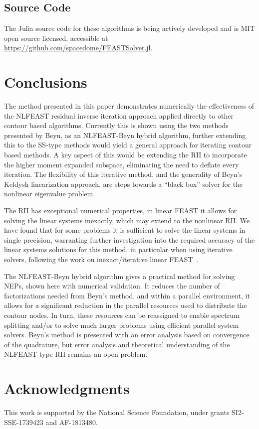 \documentclass[onefignum,onetabnum]{siamart190516}
\begin{document}
\subsection{Source Code}

The Julia source code for these algorithms is being actively developed and is MIT open source licensed, accessible at \url{https://github.com/spacedome/FEASTSolver.jl}. 



\section{Conclusions}
\label{sec:conclusions}

The method presented in this paper demonstrates numerically the effectiveness of the NLFEAST residual inverse iteration approach applied directly to other contour based algorithms.
Currently this is shown using the two methods presented by Beyn, as an NLFEAST-Beyn hybrid algorithm, further extending this to the SS-type methods would yield a general approach for iterating contour based methods.
A key aspect of this would be extending the RII to incorporate the higher moment expanded subspace, eliminating the need to deflate every iteration.
The flexibility of this iterative method, and the generality of Beyn's Keldysh linearization approach, are steps towards a ``black box'' solver for the nonlinear eigenvalue problem.

The RII has exceptional numerical properties, in linear FEAST it allows for solving the linear systems inexactly, which may extend to the nonlinear RII.
We have found that for some problems it is sufficient to solve the linear systems in single precision, warranting further investigation into the required accuracy of the linear systems solutions for this method, in particular when using iterative solvers, following the work on inexact/iterative linear FEAST~\cite{gavin2017}.

The NLFEAST-Beyn hybrid algorithm gives a practical method for solving NEPs, shown here with numerical validation.
It reduces the number of factorizations needed from Beyn's method, and within a parallel environment, it allows for a significant reduction in the parallel resources used to distribute the contour nodes. In turn, these resources can be reassigned to enable spectrum splitting and/or to solve much larger problems using efficient parallel system solvers.  
Beyn's method is presented with an error analysis based on convergence of the quadrature, but error analysis and theoretical understanding of the NLFEAST-type RII remains an open problem.





\section*{Acknowledgments}
This work is supported by the National Science Foundation, under grants SI2-SSE-1739423 and
 AF-1813480.
\nocite{*}



\end{document}
